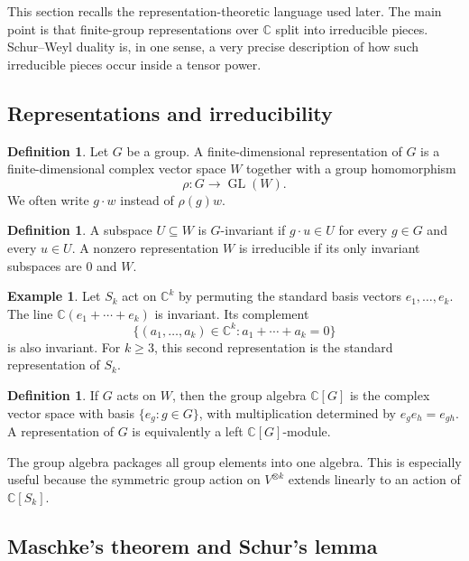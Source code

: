 \documentclass[12pt,a4paper]{article}
\theoremstyle{definition}
\newtheorem{definition}[theorem]{Definition}
\newtheorem{example}[theorem]{Example}
\theoremstyle{remark}
\newcommand{\C}{\mathbb{C}}
\newcommand{\GL}{\operatorname{GL}}
\begin{document}
This section recalls the representation-theoretic language used later.  The
main point is that finite-group representations over \(\C\) split into
irreducible pieces.  Schur--Weyl duality is, in one sense, a very precise
description of how such irreducible pieces occur inside a tensor power.

\subsection{Representations and irreducibility}

\begin{definition}
Let \(G\) be a group.  A finite-dimensional representation of \(G\) is a
finite-dimensional complex vector space \(W\) together with a group
homomorphism
\[
\rho:G\longrightarrow \GL(W).
\]
We often write \(g\cdot w\) instead of \(\rho(g)w\).
\end{definition}

\begin{definition}
A subspace \(U\subseteq W\) is \(G\)-invariant if \(g\cdot u\in U\) for every
\(g\in G\) and every \(u\in U\).  A nonzero representation \(W\) is
irreducible if its only invariant subspaces are \(0\) and \(W\).
\end{definition}

\begin{example}
Let \(S_k\) act on \(\C^k\) by permuting the standard basis vectors
\(e_1,\dots,e_k\).  The line \(\C(e_1+\cdots+e_k)\) is invariant.  Its
complement
\[
\{(a_1,\dots,a_k)\in \C^k:a_1+\cdots+a_k=0\}
\]
is also invariant.  For \(k\ge 3\), this second representation is the
standard representation of \(S_k\).
\end{example}

\begin{definition}
If \(G\) acts on \(W\), then the group algebra \(\C[G]\) is the complex vector
space with basis \(\{e_g:g\in G\}\), with multiplication determined by
\(e_g e_h=e_{gh}\).  A representation of \(G\) is equivalently a left
\(\C[G]\)-module.
\end{definition}

The group algebra packages all group elements into one algebra.  This is
especially useful because the symmetric group action on \(V^{\otimes k}\)
extends linearly to an action of \(\C[S_k]\).

\subsection{Maschke's theorem and Schur's lemma}
\end{document}
